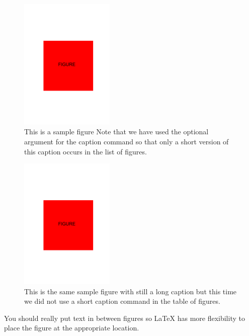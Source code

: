 \documentclass[msc,oneside]{ubcthesis}%
\begin{document}
\begin{figure}[ht]
  \begin{center}
    \includegraphics[width=0.4\textwidth]{figure}
    \caption[Sample figure.]{\label{fig:happy} This is a sample figure
      Note that we have
      used the optional argument for the caption command so that only
      a short version of this caption occurs in the list of figures.}
  \end{center}
\end{figure}

\begin{figure}[ht]
  \begin{center}
    \includegraphics[width=0.4\textwidth]{figure}
    \caption{\label{fig:happy2} This is the same sample figure with still
			a long caption but this time we did not use a short caption command
			in the table of figures.}
  \end{center}
\end{figure}

You should really put text in between figures so LaTeX has more flexibility to place the figure at the appropriate location.
\end{document}

